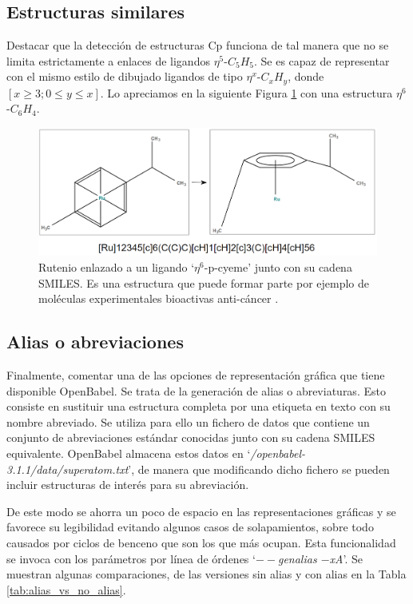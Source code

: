 \subsection{Estructuras similares}
Destacar que la detección de estructuras Cp funciona de tal manera que no se limita estrictamente a enlaces de ligandos $\eta^{5}$-$C_{5}H_{5}$. Se es capaz de representar con el mismo estilo de dibujado ligandos de tipo $\eta^{x}$-$C_{x}H_{y}$, donde $[x \geq 3; 0 \leq y \leq x]$. Lo apreciamos en la siguiente Figura \ref{fig:n6_ligand_cp} con una estructura $\eta^{6}$-$C_{6}H_{4}$.

\begin{figure}[h!]
    \centering
    \includegraphics[scale=0.32]{imagenes/resultados/moleculas/Rutenio_n6_ligand_vs_original.png}
    \caption{Rutenio enlazado a un ligando `$\eta^{6}$-p-cyeme' junto con su cadena SMILES. Es una estructura que puede formar parte por ejemplo de moléculas experimentales bioactivas anti-cáncer \cite{rutenio_diimines_2018}.}
    \label{fig:n6_ligand_cp}
\end{figure}




\newpage

\subsection{Alias o abreviaciones}
Finalmente, comentar una de las opciones de representación gráfica que tiene disponible OpenBabel. Se trata de la generación de alias o abreviaturas. Esto consiste en sustituir una estructura completa por una etiqueta en texto con su nombre abreviado. Se utiliza para ello un fichero de datos que contiene un conjunto de abreviaciones estándar conocidas junto con su cadena SMILES equivalente. OpenBabel almacena estos datos en `\textit{/openbabel-3.1.1/data/superatom.txt}', de manera que modificando dicho fichero se pueden incluir estructuras de interés para su abreviación.

De este modo se ahorra un poco de espacio en las representaciones gráficas y se favorece su legibilidad evitando algunos casos de solapamientos, sobre todo causados por ciclos de benceno que son los que más ocupan. Esta funcionalidad se invoca con los parámetros por línea de órdenes `\textit{$--$genalias $-$xA}'. Se muestran algunas comparaciones, de las versiones sin alias y con alias en la Tabla \ref{tab:alias_vs_no_alias}.

